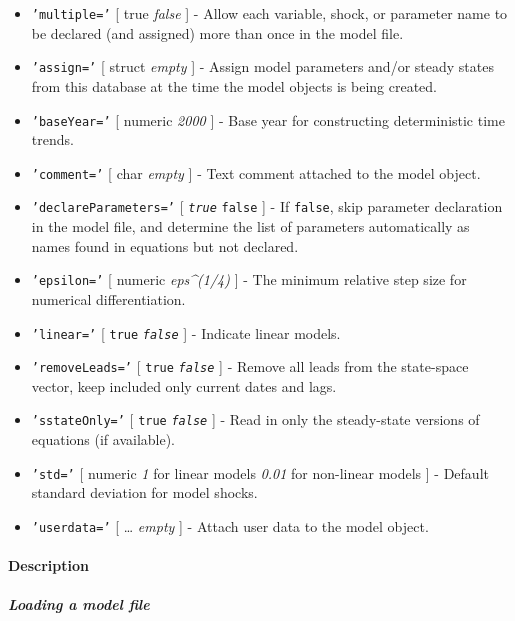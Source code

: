 \begin{itemize}
\item
  \texttt{'multiple='} {[} true \textbar{} \emph{false} {]} - Allow each
  variable, shock, or parameter name to be declared (and assigned) more
  than once in the model file.
\item
  \texttt{'assign='} {[} struct \textbar{} \emph{empty} {]} - Assign
  model parameters and/or steady states from this database at the time
  the model objects is being created.
\item
  \texttt{'baseYear='} {[} numeric \textbar{} \emph{2000} {]} - Base
  year for constructing deterministic time trends.
\item
  \texttt{'comment='} {[} char \textbar{} \emph{empty} {]} - Text
  comment attached to the model object.
\item
  \texttt{'declareParameters='} {[} \emph{\texttt{true}} \textbar{}
  \texttt{false} {]} - If \texttt{false}, skip parameter declaration in
  the model file, and determine the list of parameters automatically as
  names found in equations but not declared.
\item
  \texttt{'epsilon='} {[} numeric \textbar{} \emph{eps\^{}(1/4)} {]} -
  The minimum relative step size for numerical differentiation.
\item
  \texttt{'linear='} {[} \texttt{true} \textbar{} \emph{\texttt{false}}
  {]} - Indicate linear models.
\item
  \texttt{'removeLeads='} {[} \texttt{true} \textbar{}
  \emph{\texttt{false}} {]} - Remove all leads from the state-space
  vector, keep included only current dates and lags.
\item
  \texttt{'sstateOnly='} {[} \texttt{true} \textbar{}
  \emph{\texttt{false}} {]} - Read in only the steady-state versions of
  equations (if available).
\item
  \texttt{'std='} {[} numeric \textbar{} \emph{1} for linear models
  \textbar{} \emph{0.01} for non-linear models {]} - Default standard
  deviation for model shocks.
\item
  \texttt{'userdata='} {[} \ldots{} \textbar{} \emph{empty} {]} - Attach
  user data to the model object.
\end{itemize}

\paragraph{Description}\label{description}

\subparagraph{Loading a model file}\label{loading-a-model-file}

